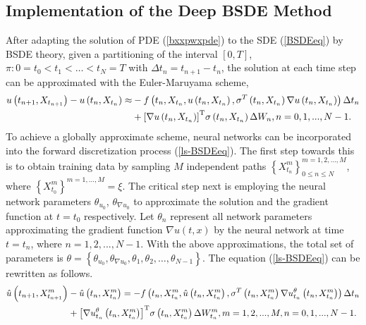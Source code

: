 \documentclass[11pt]{article}
\begin{document}
\subsection{Implementation of the Deep BSDE Method}
After adapting the solution of PDE (\ref{bxxpwxpde}) to the SDE (\ref{BSDEeq}) by BSDE theory, given a partitioning of the interval $[0,T]$, $\pi:0=t_0<t_1<\dots<t_N=T$ with $\Delta t_n=t_{n+1}-t_n$, the solution at each time step can be approximated with the Euler-Maruyama scheme,
\begin{equation}\label{ls-BSDEeq}
	\begin{aligned}
		u\left( {{t_{n + 1}},{X_{{t_{n + 1}}}}} \right) - u\left( {{t_n},{X_{{t_n}}}} \right)   \approx & - f\left( {{t_n},{X_{{t_n}}},u\left( {{t_n},{X_{{t_n}}}} \right),{\sigma ^{{T}}}\left( {{t_n},{X_{{t_n}}}} \right)\nabla u\left( {{t_n},{X_{{t_n}}}} \right)} \right)\Delta {t_n}\\
		& + {{\left[ {\nabla u\left( {{t_n},{X_{{t_n}}}} \right)} \right]}^{\rm{T}}}\sigma \left( {{t_n},{X_{{t_n}}}} \right)\Delta {W_n},n = 0,1,...,N - 1.
	\end{aligned}
\end{equation}
To achieve a globally approximate scheme, neural networks can be incorporated into the forward discretization process (\ref{ls-BSDEeq}). The first step towards this is to obtain training data by sampling $M$ independent paths ${\left\{ {X_{{t_n}}^m} \right\}_{0 \le n \le N}^{m = 1,2, \ldots, M}}$, where $\left\{X_{t_0}^m\right\}^{m=1, \ldots, M}=\xi$. The critical step next is employing the neural network parameters ${\theta _{{u_0}}}$, ${\theta _{\nabla {u_0}}}$ to approximate the solution and the gradient function at $t=t_0$ respectively. Let $\theta_n$ represent all network parameters approximating the gradient function $\nabla u(t,x)$ by the neural network at time $t=t_n$, where $n = 1,2,..., N - 1$.  
With the above approximations, the total set of parameters is $\theta=\left\{{\theta _{{u_0}}}, {\theta _{\nabla {u_0}}}, \theta_1, \theta_2, \ldots, \theta_{N-1}\right\}$. The equation (\ref{ls-BSDEeq}) can be rewritten as follows.
\begin{equation}\label{nn-ls-BSDEeq}
	\begin{aligned}
		\hat u\left( {{t_{n + 1}},X_{{t_{n + 1}}}^m} \right) & - \hat u\left( {{t_n},X_{{t_n}}^m} \right)  =  - f\left( {{t_n},X_{{t_n}}^m,\hat u\left( {{t_n},X_{{t_n}}^m} \right),{\sigma ^{{T}}}\left( {{t_n},X_{{t_n}}^m} \right)\nabla u_{{t_n}}^\theta \left( {{t_n},X_{{t_n}}^m} \right)} \right)\Delta {t_n}\\
		& + {\left[ {\nabla u_{{t_n}}^\theta \left( {{t_n},X_{{t_n}}^m} \right)} \right]^{\rm{T}}}\sigma \left( {{t_n},X_{{t_n}}^m} \right)\Delta W_{{t_n}}^m,m = 1,2,...,M,n = 0,1,...,N - 1.
	\end{aligned}
\end{equation}
\end{document}
